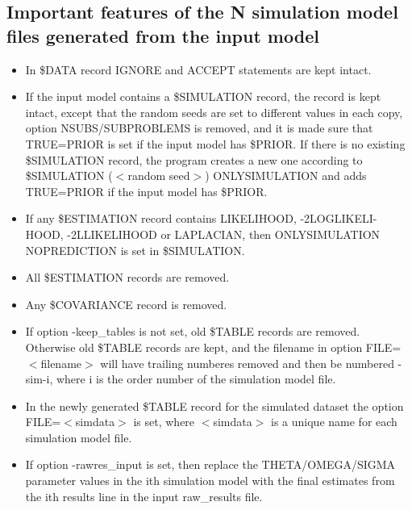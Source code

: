 \subsection{Important features of the N simulation model files generated from the input model}
\begin{itemize}
	\item In \$DATA record IGNORE and ACCEPT statements are kept intact.
	\item If the input model contains a \$SIMULATION record, the record is kept intact, except that the random seeds are set to different values in each copy, option NSUBS/SUBPROBLEMS is removed, and it is made sure that TRUE=PRIOR is set if the input model has \$PRIOR. If there is no existing \$SIMULATION record, the program creates a new one according to \$SIMULATION ($<$random seed$>$) ONLYSIMULATION and adds TRUE=PRIOR if the input model has \$PRIOR.
	\item If any \$ESTIMATION record contains LIKELIHOOD, -2LOGLIKELI-\\HOOD, -2LLIKELIHOOD or LAPLACIAN, then ONLYSIMULATION NOPREDICTION is set in \$SIMULATION.  
	\item All \$ESTIMATION records are removed. 
	\item Any \$COVARIANCE record is removed. 
	\item If option -keep\_tables is not set, old \$TABLE records are removed. Otherwise old \$TABLE records are kept, and the filename in option FILE=$<$filename$>$ will have trailing numberes removed and then be numbered -sim-i, where i is the order number of the simulation model file. 
	\item In the newly generated \$TABLE record for the simulated dataset the option FILE=$<$simdata$>$ is set, where $<$simdata$>$ is a unique name for each simulation model file.
	\item If option -rawres\_input is set, then replace the THETA/OMEGA/SIGMA parameter values in the ith simulation model with the final estimates from the ith results line in the input raw\_results file.
\end{itemize}

